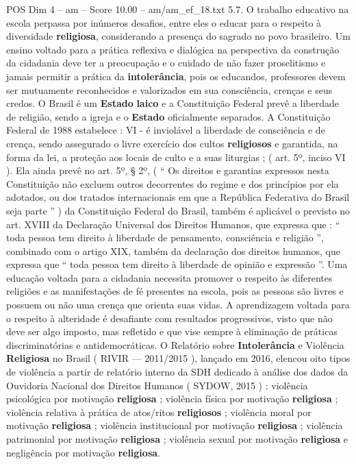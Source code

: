 \begin{textsample}{POS Dim 4 – am – Score 10.00 – am/am\_ef\_18.txt}  \label{ex:f4_pos_106}
5.7.
O trabalho educativo na escola perpassa por inúmeros desafios, entre eles o educar para o respeito à diversidade \textbf{religiosa}, considerando a presença do sagrado no povo brasileiro.
Um ensino voltado para a prática reflexiva e dialógica na perspectiva da construção da cidadania deve ter a preocupação e o cuidado de não fazer proselitismo e jamais permitir a prática da \textbf{intolerância}, pois os educandos, professores devem ser mutuamente reconhecidos e valorizados em sua consciência, crenças e seus credos.
O Brasil é um \textbf{Estado} \textbf{laico} e a Constituição Federal prevê a liberdade de religião, sendo a igreja e o \textbf{Estado} oficialmente separados.
A Constituição Federal de 1988 estabelece : VI - é inviolável a liberdade de consciência e de crença, sendo assegurado o livre exercício dos cultos \textbf{religiosos} e garantida, na forma da lei, a proteção aos locais de culto e a suas liturgias ; ( art. 5º, inciso VI ).
Ela ainda prevê no art. 5º, § 2º, ( “ Os direitos e garantias expressos nesta Constituição não excluem outros decorrentes do regime e dos princípios por ela adotados, ou dos tratados internacionais em que a República Federativa do Brasil seja parte ” ) da Constituição Federal do Brasil, também é aplicável o previsto no art.
XVIII da Declaração Universal dos Direitos Humanos, que expressa que : “ toda pessoa tem direito à liberdade de pensamento, consciência e religião ”, combinado com o artigo XIX, também da declaração dos direitos humanos, que expressa que “ toda pessoa tem direito à liberdade de opinião e expressão ”.
Uma educação voltada para a cidadania necessita promover o respeito às diferentes religiões e as manifestações de fé presentes na escola, pois as pessoas são livres e possuem ou não uma crença que orienta suas vidas.
A aprendizagem voltada para o respeito à alteridade é desafiante com resultados progressivos, visto que não deve ser algo imposto, mas refletido e que vise sempre à eliminação de práticas discriminatórias e antidemocráticas.
O Relatório sobre \textbf{Intolerância} e Violência \textbf{Religiosa} no Brasil ( RIVIR — 2011/2015 ), lançado em 2016, elencou oito tipos de violência a partir de relatório interno da SDH dedicado à análise dos dados da Ouvidoria Nacional dos Direitos Humanos ( SYDOW, 2015 ) : violência psicológica por motivação \textbf{religiosa} ; violência física por motivação \textbf{religiosa} ; violência relativa à prática de atos/ritos \textbf{religiosos} ; violência moral por motivação \textbf{religiosa} ; violência institucional por motivação \textbf{religiosa} ; violência patrimonial por motivação \textbf{religiosa} ; violência sexual por motivação \textbf{religiosa} e negligência por motivação \textbf{religiosa}.

\end{textsample}
